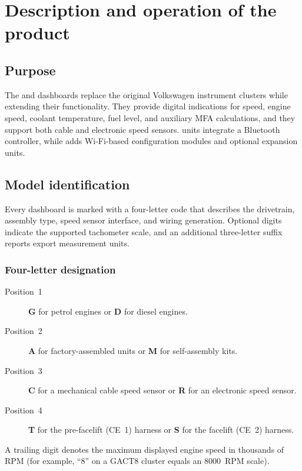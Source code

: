 \chapter{Description and operation of the product}\label{ch:description}

\section{Purpose}
The \ReplicaGenOne{} and \ReplicaNextLong{} dashboards replace the original Volkswagen instrument clusters while extending their functionality. They provide digital indications for speed, engine speed, coolant temperature, fuel level, and auxiliary MFA calculations, and they support both cable and electronic speed sensors. \ReplicaGenOneShort{} units integrate a Bluetooth controller, while \ReplicaNextShort{} adds Wi-Fi-based configuration modules and optional expansion units.

\section{Model identification}
Every dashboard is marked with a four-letter code that describes the drivetrain, assembly type, speed sensor interface, and wiring generation. Optional digits indicate the supported tachometer scale, and an additional three-letter suffix reports export measurement units.

\subsection{Four-letter designation}
\begin{description}
    \item[Position~1] \textbf{G} for petrol engines or \textbf{D} for diesel engines.
    \item[Position~2] \textbf{A} for factory-assembled units or \textbf{M} for self-assembly kits.
    \item[Position~3] \textbf{C} for a mechanical cable speed sensor or \textbf{R} for an electronic speed sensor.
    \item[Position~4] \textbf{T} for the pre-facelift (CE~1) harness or \textbf{S} for the facelift (CE~2) harness.
\end{description}
A trailing digit denotes the maximum displayed engine speed in thousands of RPM (for example, “8” on a GACT8 cluster equals an 8000~RPM scale).

